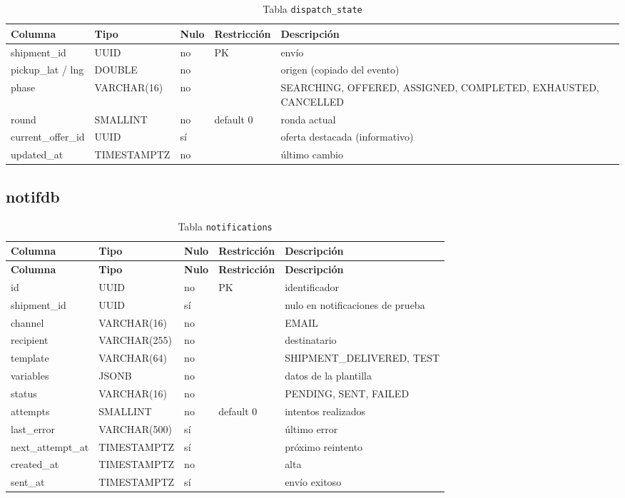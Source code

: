 \documentclass[10pt,letterpaper,twocolumn,oneside]{report}
\newcommand{\pkg}[1]{\texttt{#1}}
\begin{document}
\begin{longtable}{@{}L{3.2cm}L{3.2cm}L{1.1cm}L{3.4cm}L{3.9cm}@{}}
\caption{Tabla \pkg{dispatch\_state}}\\
\toprule
\textbf{Columna} & \textbf{Tipo} & \textbf{Nulo} & \textbf{Restricción} & \textbf{Descripción}\\
\midrule
\endhead
shipment\_id & UUID & no & PK & envío\\
pickup\_lat / lng & DOUBLE & no & & origen (copiado del evento)\\
phase & VARCHAR(16) & no & & SEARCHING, OFFERED, ASSIGNED, COMPLETED, EXHAUSTED, CANCELLED\\
round & SMALLINT & no & default 0 & ronda actual\\
current\_offer\_id & UUID & sí & & oferta destacada (informativo)\\
updated\_at & TIMESTAMPTZ & no & & último cambio\\
\bottomrule
\end{longtable}

\subsection{notifdb}

\begin{longtable}{@{}L{3.2cm}L{3.2cm}L{1.1cm}L{3.4cm}L{3.9cm}@{}}
\caption{Tabla \pkg{notifications}}\\
\toprule
\textbf{Columna} & \textbf{Tipo} & \textbf{Nulo} & \textbf{Restricción} & \textbf{Descripción}\\
\midrule
\endfirsthead
\toprule
\textbf{Columna} & \textbf{Tipo} & \textbf{Nulo} & \textbf{Restricción} & \textbf{Descripción}\\
\midrule
\endhead
id & UUID & no & PK & identificador\\
shipment\_id & UUID & sí & & nulo en notificaciones de prueba\\
channel & VARCHAR(16) & no & & EMAIL\\
recipient & VARCHAR(255) & no & & destinatario\\
template & VARCHAR(64) & no & & SHIPMENT\_DELIVERED, TEST\\
variables & JSONB & no & & datos de la plantilla\\
status & VARCHAR(16) & no & & PENDING, SENT, FAILED\\
attempts & SMALLINT & no & default 0 & intentos realizados\\
last\_error & VARCHAR(500) & sí & & último error\\
next\_attempt\_at & TIMESTAMPTZ & sí & & próximo reintento\\
created\_at & TIMESTAMPTZ & no & & alta\\
sent\_at & TIMESTAMPTZ & sí & & envío exitoso\\
\bottomrule
\end{longtable}
\end{document}
